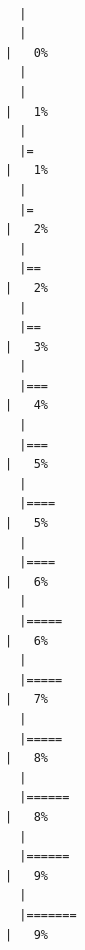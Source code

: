 \documentclass[
  letterpaper,
  DIV=11,
  numbers=noendperiod]{scrreprt}
\begin{document}
\begin{verbatim}

  |                                                                            
  |                                                                      |   0%
  |                                                                            
  |                                                                      |   1%
  |                                                                            
  |=                                                                     |   1%
  |                                                                            
  |=                                                                     |   2%
  |                                                                            
  |==                                                                    |   2%
  |                                                                            
  |==                                                                    |   3%
  |                                                                            
  |===                                                                   |   4%
  |                                                                            
  |===                                                                   |   5%
  |                                                                            
  |====                                                                  |   5%
  |                                                                            
  |====                                                                  |   6%
  |                                                                            
  |=====                                                                 |   6%
  |                                                                            
  |=====                                                                 |   7%
  |                                                                            
  |=====                                                                 |   8%
  |                                                                            
  |======                                                                |   8%
  |                                                                            
  |======                                                                |   9%
  |                                                                            
  |=======                                                               |   9%

\end{verbatim}
\end{document}
